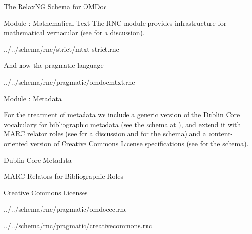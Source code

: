 \begin{omgroup}[id=rnc]{The RelaxNG Schema for OMDoc}
\begin{omgroup}[id=rnc.mtxt]{Module {}: Mathematical Text}
  The RNC module {} provides infrastructure for mathematical vernacular
  (see  for a discussion).
  
  {../../schema/rnc/strict/mtxt-strict.rnc}

  And now the pragmatic language
  
                          {../../schema/rnc/pragmatic/omdocmtxt.rnc}
\end{omgroup}

\begin{omgroup}[id=rnc.meta]{Module {}: Metadata}

  For the treatment of metadata we include a generic version of the Dublin Core vocabulary
  for bibliographic metadata (see the schema at ), and extend it with MARC
  relator roles (see {} for a discussion and
   for the schema) and a content-oriented version of Creative Commons
  License specifications (see  for the schema).


\end{omgroup}

\begin{omgroup}[id=rnc.dc]{Dublin Core Metadata}


\end{omgroup}

\begin{omgroup}[id=rnc.marc]{MARC Relators for Bibliographic Roles}

\end{omgroup}

\begin{omgroup}[id=rnc.cc]{Creative Commons Licenses}

  {../../schema/rnc/pragmatic/omdoccc.rnc}

  {../../schema/rnc/pragmatic/creativecommons.rnc}
\end{omgroup}


\end{omgroup}
